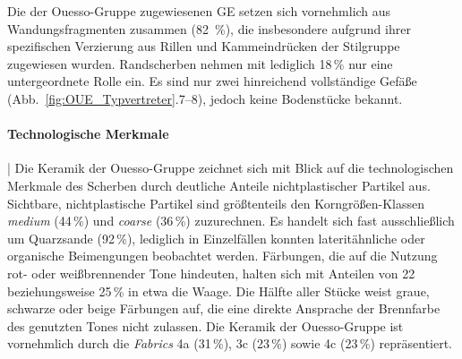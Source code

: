 Die der Ouesso-Gruppe zugewiesenen GE setzen sich vornehmlich aus Wandungsfragmenten zusammen (82~\%), die insbesondere aufgrund ihrer spezifischen Verzierung aus Rillen und Kammeindrücken der Stilgruppe zugewiesen wurden. Randscherben nehmen mit lediglich 18\,\% nur eine untergeordnete Rolle ein. Es sind nur zwei hinreichend vollständige Gefäße (Abb.~\ref{fig:OUE_Typvertreter}.7--8), jedoch keine Bodenstücke bekannt.

\paragraph{Technologische Merkmale}\hspace{-.5em}|\hspace{.5em}%
Die Keramik der Ouesso-Gruppe zeichnet sich mit Blick auf die technologischen Merkmale des Scherben durch deutliche Anteile nichtplastischer Partikel aus. Sichtbare, nichtplastische Partikel sind größtenteils den Korngrößen-Klassen \textit{medium} (44\,\%) und \textit{coarse} (36\,\%) zuzurechnen. Es handelt sich fast ausschließlich um Quarzsande (92\,\%), lediglich in Einzelfällen konnten lateritähnliche oder organische Beimengungen beobachtet werden. Färbungen, die auf die Nutzung rot- oder weißbrennender Tone hindeuten, halten sich mit Anteilen von 22 beziehungsweise 25\,\% in etwa die Waage. Die Hälfte aller Stücke weist graue, schwarze oder beige Färbungen auf, die eine direkte Ansprache der Brennfarbe des genutzten Tones nicht zulassen. Die Keramik der Ouesso-Gruppe ist vornehmlich durch die \textit{Fabrics} 4a (31\,\%), 3c (23\,\%) sowie 4c (23\,\%) repräsentiert.

